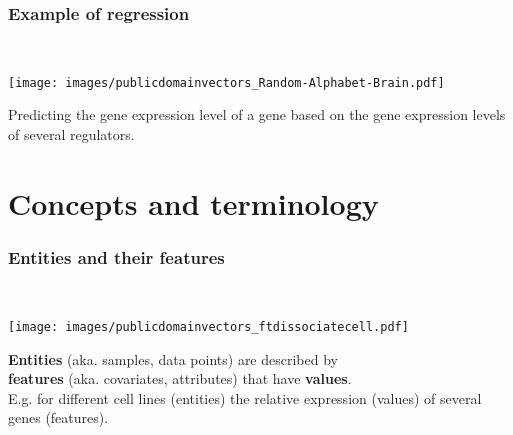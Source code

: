 \documentclass[aspectratio=169]{beamer}
\begin{document}
\begin{frame}
  \frametitle{Example of regression}
  \begin{block}{}
    \vspace{0.5cm}
    \ \ \ \
    \begin{minipage}{0.10\textwidth}
      \begin{center}
        \texttt{[image: images/publicdomainvectors\_Random-Alphabet-Brain.pdf]}
      \end{center}        
    \end{minipage}
    \hfill
    \begin{minipage}{0.80\textwidth}

     \begin{center}
       Predicting the gene expression level of a gene based on the
       gene expression levels of several regulators.
     \end{center}

    \end{minipage}
    \vspace{0.3cm}
  \end{block}
\end{frame}

\section{Concepts and terminology}

\begin{frame}{}
   \tableofcontents[currentsection]
\end{frame}

\begin{frame}
  \frametitle{Entities and their features}  
  \begin{block}{}
    \vspace{0.5cm}
    \ \ \ \
    \begin{minipage}{0.10\textwidth}
      \begin{center}
        \texttt{[image: images/publicdomainvectors\_ftdissociatecell.pdf]}
      \end{center}        
    \end{minipage}
    \hfill
    \begin{minipage}{0.80\textwidth}

      \textbf{Entities} (aka. samples, data points) are described by \\
      \textbf{features} (aka.  covariates, attributes) that have
      \textbf{values}.\\

      E.g. for different cell lines (entities) the relative expression
      (values) of several genes (features).
      
    \end{minipage}
    \vspace{0.3cm}
  \end{block}
\end{frame}
\end{document}
